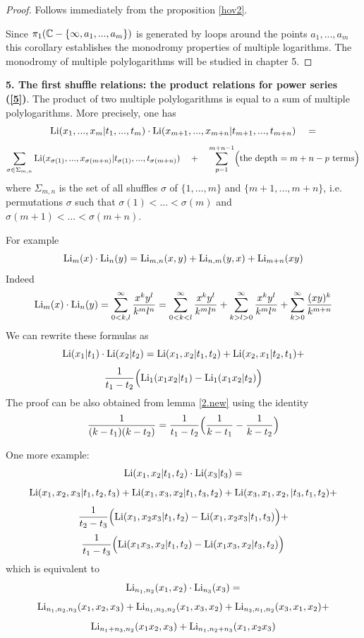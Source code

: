 \documentclass[10pt]{article}
\begin{document}
\begin{proof} Follows immediately from the proposition \ref{hov2}. 

Since $\pi_1({\mathbb C} - \{\infty, a_1, ..., a_m\})$ is generated by loops around the points 
$a_1, ..., a_m$ 
this corollary establishes the monodromy properties of multiple logarithms. The monodromy of 
multiple polylogarithms will be studied  in chapter 5. 


\end{proof}

{\bf 5.  The first shuffle relations: the product relations for power series (\ref{5})}. 
The product of two multiple polylogarithms is equal to a sum of multiple polylogarithms. 
More precisely, one has 
\begin{equation} \label{11.21.0.1}
{\rm Li}(x_1,...,x_m| t_1,...,t_m)\cdot {\rm Li}(x_{m+1},...,x_{m+n}|t_{m+1},...,t_{m+n}) \quad =
\end{equation}
$$
\sum_{\sigma \in \Sigma_{m,n}}{\rm Li}(x_{\sigma (1)},...,x_{\sigma (m+n) }|t_{\sigma ( 1) }, 
...,t_{\sigma (m+n)}) \quad + \quad \sum^{m+n-1}_{p= 1}\Bigl(\mbox{the depth $=m+n-p$ terms}\Bigr)
$$
where $\Sigma_{m,n}$ is the set of 
all shuffles $\sigma$ of $\{1,...,m\}$ and $\{m+1,...,m+n\}$, i.e. 
permutations $\sigma $ such that $\sigma(1) < ... < \sigma(m)$ 
and $\sigma(m+1) < ... < \sigma(m+n)$.

For example
$$%
{\rm Li}_{m}(x) \cdot {\rm Li}_{n}(y) = {\rm Li}_{m,n}(x,y) + {\rm Li}_{n,m}(y,x) + {\rm Li}_{m+n}(xy)
$$%
Indeed 
$$
{\rm Li}_{m}(x) \cdot {\rm Li}_{n}(y) = \sum_{0< k  , l  }^{\infty} \frac{x^{k}y^{l}}
{ k^{m}l^{n}} = 
\sum_{0< k < l  }^{\infty} \frac{x^{k}y^{l}}
{ k^{m}l^{n}} + \sum_{ k > l >0 }^{\infty} \frac{x^{k}y^{l}}
{ k^{m}l^{n}} + \sum_{ k  >0 }^{\infty} \frac{(xy)^{k} }
{ k^{m+n} }
$$
We can rewrite these formulas as
$$
{\rm Li}(x_1|t_1) \cdot {\rm Li}(x_2|t_2) =  {\rm Li}(x_1, x_2|t_1,  t_2) + {\rm Li}(x_2, x_1|t_2,  t_1) + 
$$
$$
\frac{1}{t_1-t_2}
\Bigl( {\rm Li}_1(x_1x_2|t_1 ) - {\rm Li}_1(x_1x_2|t_2 )\Bigr) 
$$
The proof can be also obtained from lemma \ref{2.new} using the identity
$$
\frac{1}{(k - t_1)(k - t_2)} = \frac{1}{t_1 - t_2}\Bigl(\frac{1}{k - t_1} - \frac{1}{k - t_2}\Bigl)
$$

One more example:
$$
{\rm Li} (x_1,x_2|t_1,t_2) \cdot {\rm Li} ( x_3|t_3) = 
$$
$$
{\rm Li} (x_1, x_2, x_3|t_1, t_2, t_3) + 
{\rm Li} (x_1, x_3, x_2|t_1, t_3, t_2) + {\rm Li} (x_3, x_1, x_2, | t_3, t_1, t_2 ) + 
$$
$$
\frac{1}{t_2-t_3}\Bigl({\rm Li} (x_1, x_2x_3|t_1, t_2 ) - {\rm Li} (x_1, x_2x_3|t_1, t_3 )\Bigr) +
$$
$$
 \frac{1}{t_1-t_3}\Bigl({\rm Li} (x_1x_3, x_2|t_1 , t_2) - {\rm Li} (x_1x_3, x_2|t_3, t_2)\Bigr) 
 $$
which is equivalent to 
$$
 {\rm Li}_{n_1,n_2}(x_1,x_2) \cdot {\rm Li}_{n_3}(x_3) =
$$
$$%
 {\rm Li}_{n_1,n_2,n_3 }(x_1,x_2,x_3) + {\rm Li}_{n_1,n_3,n_2 }(x_1,x_3,x_2) + {\rm Li}_{n_3,n_1,n_2 }(x_3,x_1,x_2) + 
$$%
$$
{\rm Li}_{n_1+n_3,n_2 }(x_1x_2, x_3) + {\rm Li}_{n_1,n_2+n_3 }(x_1, x_2x_3)
$$
\end{document}

